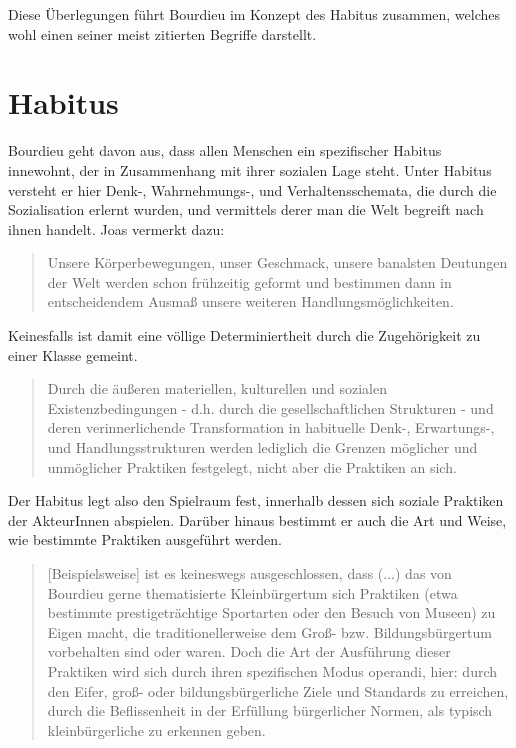 \documentclass[a4paper, german, oneside]{scrbook}
\begin{document}
Diese Überlegungen führt Bourdieu im Konzept des Habitus zusammen, welches wohl einen seiner meist zitierten Begriffe darstellt.


\section{Habitus}
\label{habitus}
Bourdieu geht davon aus, dass allen Menschen ein spezifischer Habitus innewohnt, der in Zusammenhang mit ihrer sozialen Lage steht. Unter Habitus versteht er hier Denk-, Wahrnehmungs-, und Verhaltensschemata, die durch die Sozialisation erlernt wurden, und vermittels derer man die Welt begreift nach ihnen handelt. Joas vermerkt dazu: \blockquote[{\cite[533]{joas_sozialtheorie:_2004}}]{Unsere Körperbewegungen, unser Geschmack, unsere banalsten Deutungen der Welt werden schon frühzeitig geformt und bestimmen dann in entscheidendem Ausmaß unsere weiteren Handlungsmöglichkeiten.} Keinesfalls ist damit eine völlige Determiniertheit durch die Zugehörigkeit zu einer Klasse gemeint. \blockquote[{\cite[69]{schwingel_pierre_2009}}]{Durch die äußeren materiellen, kulturellen und sozialen Existenzbedingungen - d.h. durch die gesellschaftlichen Strukturen - und deren verinnerlichende Transformation in habituelle Denk-, Erwartungs-, und Handlungsstrukturen werden lediglich die Grenzen möglicher und unmöglicher Praktiken festgelegt, nicht aber die Praktiken an sich.}

Der Habitus legt also den Spielraum fest, innerhalb dessen sich soziale Praktiken der AkteurInnen abspielen. Darüber hinaus bestimmt er auch die Art und Weise, wie bestimmte Praktiken ausgeführt werden.



\blockquote[{\cite[71]{schwingel_pierre_2009}}]{[Beispielsweise] ist es keineswegs ausgeschlossen, dass (...) das von Bourdieu gerne thematisierte Kleinbürgertum sich Praktiken (etwa bestimmte prestigeträchtige Sportarten oder den Besuch von Museen) zu Eigen macht, die traditionellerweise dem Groß- bzw. Bildungsbürgertum vorbehalten sind oder waren. Doch die Art der Ausführung dieser Praktiken wird sich durch ihren spezifischen Modus operandi, hier: durch den Eifer, groß- oder bildungsbürgerliche Ziele und Standards zu erreichen, durch die Beflissenheit in der Erfüllung bürgerlicher Normen, als typisch kleinbürgerliche zu erkennen geben.}
\end{document}
